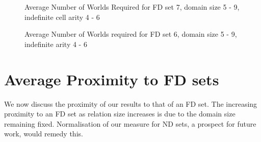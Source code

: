 {\begin{figure}
\begin{minipage}{7cm}
\centerline{}
\caption{\label{graph:4.10w} {Average Number of Worlds
Required for FD set 5, domain size 5 - 9, indefinite cell arity 4 - 6}}
\end{minipage}
\hfill
\begin{minipage}{7cm}
\centerline{}
\caption{\label{graph:4.16w} {Average Number of Worlds
Required for FD set 7, domain size 5 - 9, indefinite cell arity 4 - 6}}
\end{minipage}
\end{figure}


\begin{figure}
\begin{minipage}{7cm}
\centerline{}
\caption{\label{graph:4.12w} {Average Number of Worlds
Required for FD set 6, domain size 3 - 9, indefinite arity 2}}
\end{minipage}
\hfill
\begin{minipage}{7cm}
\centerline{}
\caption{\label{graph:4.13w} {Average Number of Worlds required 
for FD set 6, domain size 5 - 9, indefinite arity 4 - 6}}
\end{minipage}
\end{figure}





\section{Average Proximity to FD sets}

We now discuss the proximity of our results to that of an FD set. The
increasing proximity to an FD set as relation size increases is due to
the domain size remaining fixed. Normalisation of our measure for ND
sets, a prospect for future work, would remedy this.

\medskip

}
